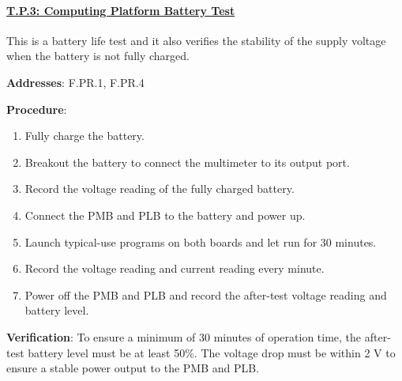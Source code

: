 \paragraph{\underline{T.P.3: Computing Platform Battery Test}}

This is a battery life test and it also verifies the stability of the supply voltage when the battery is not fully charged.

\textbf{Addresses}: F.PR.1, F.PR.4

\textbf{Procedure}:
\begin{enumerate}[noitemsep]
    \item Fully charge the battery.
    \item Breakout the battery to connect the multimeter to its output port.
    \item Record the voltage reading of the fully charged battery. 
    \item Connect the PMB and PLB to the battery and power up.
    \item Launch typical-use programs on both boards and let run for 30 minutes.
    \item Record the voltage reading and current reading every minute.
    \item Power off the PMB and PLB and record the after-test voltage reading and battery level.
\end{enumerate}

\textbf{Verification}: 
To ensure a minimum of 30 minutes of operation time, the after-test battery level must be at least 50\%. The voltage drop must be within 2 V to ensure a stable power output to the PMB and PLB.
